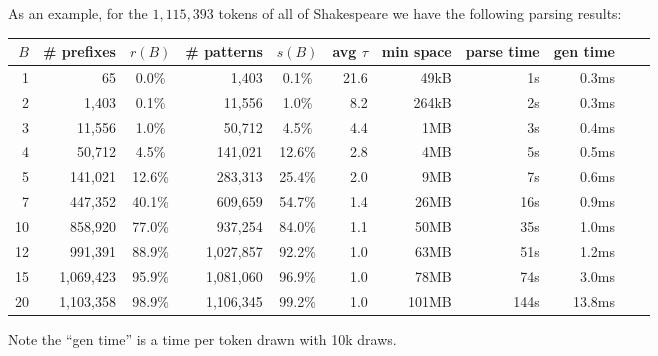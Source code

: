 \documentclass[11pt, oneside]{amsart}   	%
\begin{document}
As an example, for the $1,115,393$ tokens of all of Shakespeare we have the following parsing results:
\begin{center}
\begin{tabular}{ r r c r c r r r r r r}
 $B$ & \# prefixes & $r(B)$ & \# patterns & $s(B)$ & avg $\tau$ & min space & parse time & gen time \\ \hline
 1 & 65 & 0.0\% & 1,403 & 0.1\% & 21.6 & 49kB & 1s & 0.3ms \\  
 2 & 1,403 & 0.1\% & 11,556 & 1.0\% & 8.2 & 264kB & 2s & 0.3ms \\  
 3 & 11,556 & 1.0\% & 50,712 & 4.5\% & 4.4 & 1MB & 3s & 0.4ms \\
 4 & 50,712 & 4.5\% & 141,021 & 12.6\% & 2.8 & 4MB & 5s & 0.5ms \\
 5 & 141,021 & 12.6\% & 283,313 & 25.4\% & 2.0 & 9MB & 7s & 0.6ms \\
 7 & 447,352 & 40.1\% & 609,659 & 54.7\% & 1.4 & 26MB & 16s & 0.9ms \\
 10 & 858,920 & 77.0\% & 937,254 & 84.0\% & 1.1 & 50MB & 35s & 1.0ms \\  
 12 & 991,391 & 88.9\% & 1,027,857 & 92.2\% & 1.0 & 63MB & 51s & 1.2ms \\
 15 & 1,069,423 & 95.9\% & 1,081,060 & 96.9\% & 1.0 & 78MB & 74s & 3.0ms \\  
 20 & 1,103,358 & 98.9\% & 1,106,345 & 99.2\% & 1.0 & 101MB & 144s & 13.8ms \\  \hline

\end{tabular}
\end{center}
Note the ``gen time'' is a time per token drawn with 10k draws. 
\end{document}
